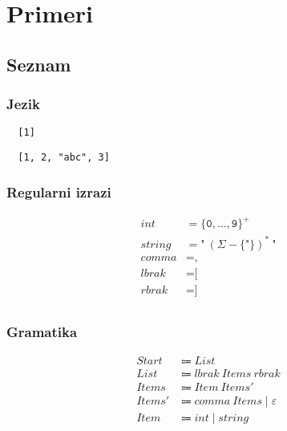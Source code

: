 \documentclass{report}
\newcommand{\Null}{\varepsilon}
\newcommand{\Alphabet}{\Sigma}
\newcommand{\Char}[1]{\texttt{#1}}
\newcommand{\Spc}{\ }
\newcommand{\Union}{\mathrel{|}}
\newcommand{\Kleene}[1]{{#1}^\ast}
\newcommand{\KleenePlus}[1]{#1^+}
\newcommand{\Arrow}{\Coloneq}
\newcommand{\NT}[1]{{#1}}
\newcommand{\T}[1]{{#1}}
\begin{document}
\section*{Primeri}

\subsection{Seznam}

\subsubsection*{Jezik}
\begin{verbatim}
  [1]
\end{verbatim}
\begin{verbatim}
  [1, 2, "abc", 3]
\end{verbatim}

\subsubsection*{Regularni izrazi}
\begin{equation*}
  \begin{aligned}
    \T{int} &= \KleenePlus{\{\Char{0}, \dots, \Char{9}\}}\\
    \T{string} &= \Char{"} \Spc \Kleene{(\Alphabet - \{\Char{"}\})} \Spc \Char{"}\\
    \T{comma} &= \Char{,}\\
    \T{lbrak} &= \Char{[}\\
    \T{rbrak} &= \Char{]}\\
  \end{aligned}
\end{equation*}

\subsubsection*{Gramatika}
\begin{equation*}
  \begin{aligned}
    \NT{Start} &\Arrow \NT{List}\\
    \NT{List} &\Arrow \T{lbrak} \Spc \NT{Items} \Spc \T{rbrak}\\
    \NT{Items} &\Arrow \NT{Item} \Spc \NT{Items'}\\
    \NT{Items'} &\Arrow \T{comma} \Spc \NT{Items} \Union \Null\\
    \NT{Item} &\Arrow \T{int} \Union \T{string}
  \end{aligned}
\end{equation*}
\end{document}
